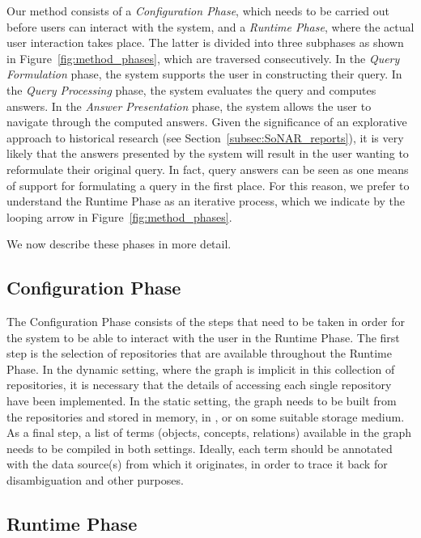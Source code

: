 Our method consists of a \emph{Configuration Phase}, which
needs to be carried out before users can interact with the system,
and a \emph{Runtime Phase}, where the actual user interaction takes place.
The latter is divided into three subphases as shown in Figure~\ref{fig:method_phases},
which are traversed consecutively.
In the \emph{Query Formulation} phase, the system supports the user 
in constructing their query.
In the \emph{Query Processing} phase, the system evaluates the query
and computes answers.
In the \emph{Answer Presentation} phase, the system allows the user to
navigate through the computed answers.
Given the significance of an explorative approach to historical research
(see Section~\ref{subsec:SoNAR_reports}),
it is very likely that the answers presented by the system will 
result in the user wanting to reformulate their original query.
In fact, query answers can be seen as one means of support
for formulating a query in the first place.
For this reason, we prefer to understand the Runtime Phase as an iterative process,
which we indicate by the looping arrow in Figure~\ref{fig:method_phases}.

We now describe these phases in more detail.

\subsection{Configuration Phase}
\label{subsec:configuration_phase}

The Configuration Phase consists of the steps that need to be taken
in order for the system to be able to interact with the user in the Runtime Phase.
The first step is the selection of repositories that are available 
throughout the Runtime Phase.
In the dynamic setting, where the graph is implicit in this collection of repositories,
it is necessary that the details of accessing each single repository
have been implemented.
In the static setting, the graph needs to be built from the repositories
and stored in memory, in , or on some suitable storage medium.
As a final step, a list of terms (objects, concepts, relations) available in the graph
needs to be compiled in both settings. Ideally, each term should be annotated with the data source(s)
from which it originates, in order to trace it back for disambiguation and
other purposes.

\subsection{Runtime Phase}

